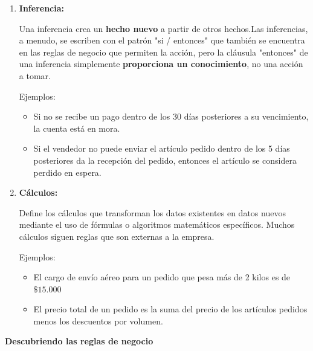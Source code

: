 \begin{enumerate}
        \item \textbf{Inferencia:}
    
        Una inferencia crea un \textbf{hecho nuevo} a partir de otros hechos.Las inferencias, a menudo, se escriben con el patrón "si / entonces" que también se encuentra en las reglas de negocio que permiten la acción, pero la cláusula "entonces" de una inferencia simplemente \textbf{proporciona un conocimiento}, no una acción a tomar.
    
        Ejemplos:
    
        \begin{itemize}
            \item Si no se recibe un pago dentro de los 30 días posteriores a su vencimiento, la cuenta está en mora.
            \item Si el vendedor no puede enviar el artículo pedido dentro de los 5 días posteriores da la recepción del pedido, entonces el artículo se considera perdido en espera.
        \end{itemize}
        
        \newpage
    
        \item \textbf{Cálculos:}
    
        Define los cálculos que transforman los datos existentes en datos nuevos mediante el uso de fórmulas o algoritmos matemáticos específicos. Muchos cálculos siguen reglas que son externas a la empresa.
        
        Ejemplos:
        
        \begin{itemize}
            \item El cargo de envío aéreo para un pedido que pesa más de 2 kilos es de $\$15.000$
            \item El precio total de un pedido es la suma del precio de los artículos pedidos menos los descuentos por volumen.
        \end{itemize}
        
        
    \end{enumerate}
    
    \textbf{Descubriendo las reglas de negocio}
        
